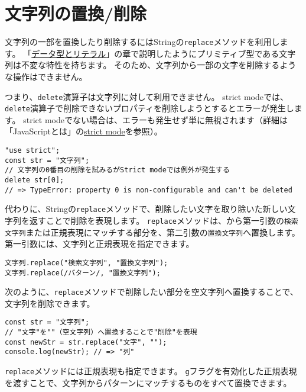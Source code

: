 \hypertarget{replace-delete}{%
\section{文字列の置換/削除}\label{replace-delete}}

文字列の一部を置換したり削除するにはStringの\texttt{replace}メソッドを利用します。
「\hyperlink{data-type-and-literal}{データ型とリテラル}」の章で説明したようにプリミティブ型である文字列は不変な特性を持ちます。
そのため、文字列から一部の文字を削除するような操作はできません。

つまり、\texttt{delete}演算子は文字列に対して利用できません。
strict modeでは、\texttt{delete}演算子で削除できないプロパティを削除しようとするとエラーが発生します。
strict modeでない場合は、エラーも発生せず単に無視されます（詳細は「JavaScriptとは」の\hyperlink{strict-mode}{strict mode}を参照）。

\begin{lstlisting}
"use strict";
const str = "文字列";
// 文字列の0番目の削除を試みるがStrict modeでは例外が発生する
delete str[0]; 
// => TypeError: property 0 is non-configurable and can't be deleted
\end{lstlisting}

代わりに、Stringの\texttt{replace}メソッドで、削除したい文字を取り除いた新しい文字列を返すことで削除を表現します。
\texttt{replace}メソッドは、\textbf{}から第一引数の\texttt{検索文字列}または正規表現にマッチする部分を、第二引数の\texttt{置換文字列}へ置換します。
第一引数には、文字列と正規表現を指定できます。

\begin{lstlisting}
文字列.replace("検索文字列", "置換文字列");
文字列.replace(/パターン/, "置換文字列");
\end{lstlisting}

次のように、\texttt{replace}メソッドで削除したい部分を空文字列へ置換することで、文字列を削除できます。

\begin{lstlisting}
const str = "文字列";
// "文字"を""（空文字列）へ置換することで"削除"を表現
const newStr = str.replace("文字", "");
console.log(newStr); // => "列"
\end{lstlisting}

\texttt{replace}メソッドには正規表現も指定できます。
\texttt{g}フラグを有効化した正規表現を渡すことで、文字列からパターンにマッチするものをすべて置換できます。

